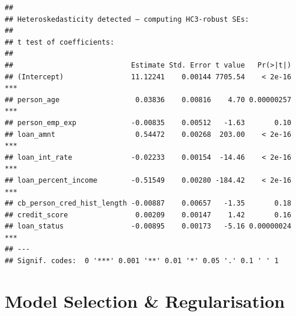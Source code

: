 \documentclass[
]{article}
\newenvironment{Shaded}{\begin{snugshade}}{\end{snugshade}}
\newcommand{\AttributeTok}[1]{\textcolor[rgb]{0.13,0.29,0.53}{#1}}
\newcommand{\CommentTok}[1]{\textcolor[rgb]{0.56,0.35,0.01}{\textit{#1}}}
\newcommand{\ControlFlowTok}[1]{\textcolor[rgb]{0.13,0.29,0.53}{\textbf{#1}}}
\newcommand{\FloatTok}[1]{\textcolor[rgb]{0.00,0.00,0.81}{#1}}
\newcommand{\FunctionTok}[1]{\textcolor[rgb]{0.13,0.29,0.53}{\textbf{#1}}}
\newcommand{\NormalTok}[1]{#1}
\newcommand{\OtherTok}[1]{\textcolor[rgb]{0.56,0.35,0.01}{#1}}
\newcommand{\SpecialCharTok}[1]{\textcolor[rgb]{0.81,0.36,0.00}{\textbf{#1}}}
\newcommand{\StringTok}[1]{\textcolor[rgb]{0.31,0.60,0.02}{#1}}
\begin{document}
\begin{Shaded}
\end{Shaded}

\begin{verbatim}
## 
## Heteroskedasticity detected — computing HC3-robust SEs:
## 
## t test of coefficients:
## 
##                            Estimate Std. Error t value   Pr(>|t|)    
## (Intercept)                11.12241    0.00144 7705.54    < 2e-16 ***
## person_age                  0.03836    0.00816    4.70 0.00000257 ***
## person_emp_exp             -0.00835    0.00512   -1.63       0.10    
## loan_amnt                   0.54472    0.00268  203.00    < 2e-16 ***
## loan_int_rate              -0.02233    0.00154  -14.46    < 2e-16 ***
## loan_percent_income        -0.51549    0.00280 -184.42    < 2e-16 ***
## cb_person_cred_hist_length -0.00887    0.00657   -1.35       0.18    
## credit_score                0.00209    0.00147    1.42       0.16    
## loan_status                -0.00895    0.00173   -5.16 0.00000024 ***
## ---
## Signif. codes:  0 '***' 0.001 '**' 0.01 '*' 0.05 '.' 0.1 ' ' 1
\end{verbatim}

\section{Model Selection \&
Regularisation}\label{model-selection-regularisation}
\end{document}
